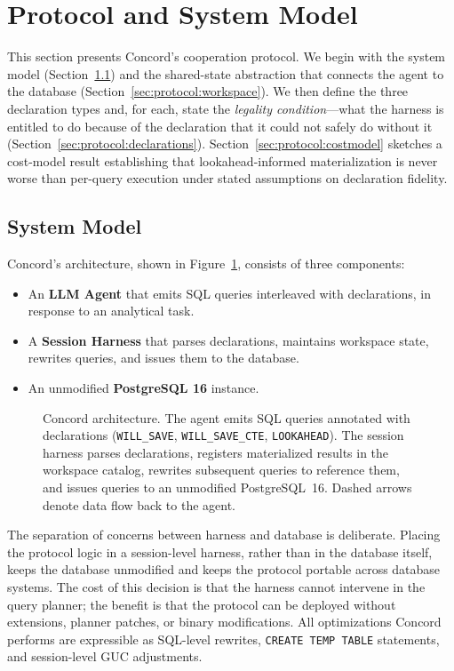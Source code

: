 \section{Protocol and System Model}
\label{sec:protocol}

This section presents Concord's cooperation protocol. We begin with the system model (Section~\ref{sec:protocol:model}) and the shared-state abstraction that connects the agent to the database (Section~\ref{sec:protocol:workspace}). We then define the three declaration types and, for each, state the \emph{legality condition}---what the harness is entitled to do because of the declaration that it could not safely do without it (Section~\ref{sec:protocol:declarations}). Section~\ref{sec:protocol:costmodel} sketches a cost-model result establishing that lookahead-informed materialization is never worse than per-query execution under stated assumptions on declaration fidelity.

\subsection{System Model}
\label{sec:protocol:model}

Concord's architecture, shown in Figure~\ref{fig:system}, consists of three components:

\begin{itemize}
\item An \textbf{LLM Agent} that emits SQL queries interleaved with declarations, in response to an analytical task.
\item A \textbf{Session Harness} that parses declarations, maintains workspace state, rewrites queries, and issues them to the database.
\item An unmodified \textbf{PostgreSQL 16} instance.
\end{itemize}

\begin{figure}[t]
\centering

\caption{Concord architecture. The agent emits SQL queries annotated with declarations (\texttt{WILL\_SAVE}, \texttt{WILL\_SAVE\_CTE}, \texttt{LOOKAHEAD}). The session harness parses declarations, registers materialized results in the workspace catalog, rewrites subsequent queries to reference them, and issues queries to an unmodified PostgreSQL~16. Dashed arrows denote data flow back to the agent.}
\label{fig:system}
\end{figure}

The separation of concerns between harness and database is deliberate. Placing the protocol logic in a session-level harness, rather than in the database itself, keeps the database unmodified and keeps the protocol portable across database systems. The cost of this decision is that the harness cannot intervene in the query planner; the benefit is that the protocol can be deployed without extensions, planner patches, or binary modifications. All optimizations Concord performs are expressible as SQL-level rewrites, \texttt{CREATE TEMP TABLE} statements, and session-level GUC adjustments.


